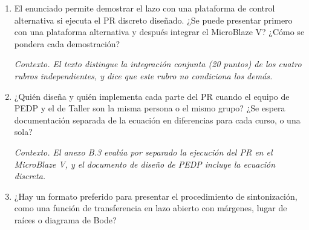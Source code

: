 \documentclass[11pt,a4paper]{article}
\newcommand{\ctx}[1]{\par\vspace{0.2em}\small\textit{Contexto. #1}\normalsize}
\begin{document}
\begin{enumerate}[resume]
  \item El enunciado permite demostrar el lazo con una plataforma de control alternativa si ejecuta el PR discreto diseñado. ¿Se puede presentar primero con una plataforma alternativa y después integrar el MicroBlaze V? ¿Cómo se pondera cada demostración?
  \ctx{El texto distingue la integración conjunta (20 puntos) de los cuatro rubros independientes, y dice que este rubro no condiciona los demás.}

  \item ¿Quién diseña y quién implementa cada parte del PR cuando el equipo de PEDP y el de Taller son la misma persona o el mismo grupo? ¿Se espera documentación separada de la ecuación en diferencias para cada curso, o una sola?
  \ctx{El anexo B.3 evalúa por separado la ejecución del PR en el MicroBlaze V, y el documento de diseño de PEDP incluye la ecuación discreta.}

  \item ¿Hay un formato preferido para presentar el procedimiento de sintonización, como una función de transferencia en lazo abierto con márgenes, lugar de raíces o diagrama de Bode?
\end{enumerate}
\end{document}
